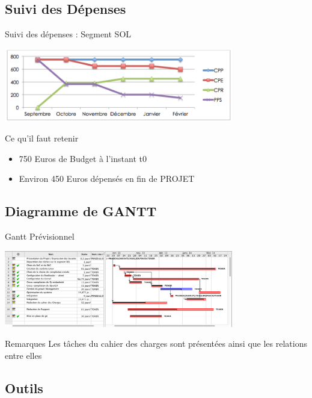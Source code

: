 \documentclass[11pt]{beamer}
\begin{document}
	\subsection{Suivi des Dépenses}
	\begin{frame}{Suivi des dépenses : Segment SOL}
		\begin{center}
			\includegraphics[width=10cm]{common/depenses.png}
		\end{center}
		\begin{block}{Ce qu'il faut retenir}
		\begin{itemize}
			\item 750 Euros de Budget à l'instant t0
			\item Environ 450 Euros dépensés en fin de PROJET
		\end{itemize}
		\end{block}
	\end{frame}
	
	
	\subsection{Diagramme de GANTT}
	\begin{frame}{Gantt Prévisionnel}
		\begin{center}
			\includegraphics[width=10cm]{common/Gantt.png}
		\end{center}
		\begin{block}{Remarques}
			\centering Les tâches du cahier des charges sont présentées ainsi que les relations entre elles
		\end{block}
	\end{frame}
	
	
	\subsection{Outils}
\end{document}

